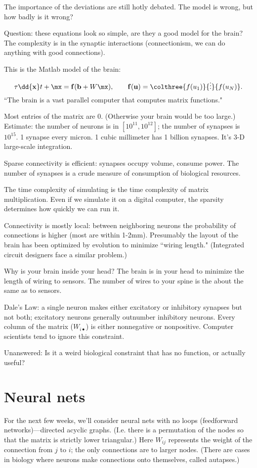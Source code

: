 The importance of the deviations are still hotly debated. The model is wrong, but how badly is it wrong?

Question: these equations look so simple, are they a good model for the brain? The complexity is in the synaptic interactions (connectionism, we can do anything with good connections).

This is the Matlab model of the brain:
\[
\tau \dd{\mathbf x}t+\mx = \mathbf f(\mathbf b+W\mx),\qquad \mathbf f(\mathbf u)=\colthree{f(u_1)}{\vdots}{f(u_N)}.
\]
``The brain is a vast parallel computer that computes matrix functions."

Most entries of the matrix are 0. (Otherwise your brain would be too large.) Estimate: the number of neurons is in $[10^{11}, 10^{12}]$; the number of synapses is $10^{15}$. 1 synapse every micron. 1 cubic millimeter has 1 billion synapses. It's 3-D large-scale integration.

Sparse connectivity is efficient: synapses occupy volume, consume power. The number of synapses is a crude measure of consumption of biological resources.

The time complexity of simulating is the time complexity of matrix multiplication. Even if we simulate it on a digital computer, the sparsity determines how quickly we can run it.

Connectivity is mostly local: between neighboring neurons the probability of connections is higher (most are within 1-2mm). Presumably the layout of the brain has been optimized by evolution to minimize ``wiring length." (Integrated circuit designers face a similar problem.)

Why is your brain inside your head? The brain is in your head to minimize the length of wiring to sensors. The number of wires to your spine is the about the same as to sensors.

Dale's Law: a single neuron makes either excitatory or inhibitory synapses but not both; excitatory  neurons generally outnumber inhibitory neurons. Every column of the matrix ($W_{i\bullet}$) is either nonnegative or nonpositive. Computer scientists tend to ignore this constraint.

Unanswered: Is it a weird biological constraint that has no function, or actually useful?

\section{Neural nets}

For the next few weeks, we'll consider neural nets with no loops (feedforward networks)---directed acyclic graphs. (I.e. there is a permutation of the nodes so that the matrix is strictly lower triangular.) Here $W_{ij}$ represents the weight of the connection from $j$ to $i$; the only connections are to larger nodes. 
(There are cases in biology where neurons make connections onto themselves, called autapses.)

